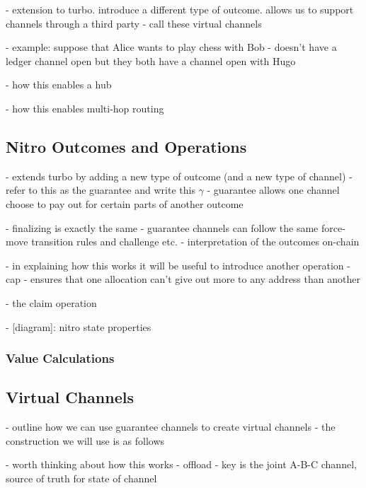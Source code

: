 \documentclass{article}
\theoremstyle{definition}
\begin{document}
% 

- extension to turbo. introduce a different type of outcome. allows us to support channels through
  a third party
- call these virtual channels

- example: suppose that Alice wants to play chess with Bob
- doesn't have a ledger channel open but they both have a channel open with Hugo

- how this enables a hub

- how this enables multi-hop routing

\subsection{Nitro Outcomes and Operations}

- extends turbo by adding a new type of outcome (and a new type of channel)
- refer to this as the guarantee and write this $\gamma$
- guarantee allows one channel choose to pay out for certain parts of another outcome

- finalizing is exactly the same
- guarantee channels can follow the same force-move transition rules and challenge etc.
- interpretation of the outcomes on-chain

- in explaining how this works it will be useful to introduce another operation
- cap - ensures that one allocation can't give out more to any address than another



- the claim operation




- [diagram]: nitro state properties


\subsubsection{Value Calculations}

\subsection{Virtual Channels}

- outline how we can use guarantee channels to create virtual channels
- the construction we will use is as follows



- worth thinking about how this works
- offload
- key is the joint A-B-C channel, source of truth for state of channel
\end{document}

